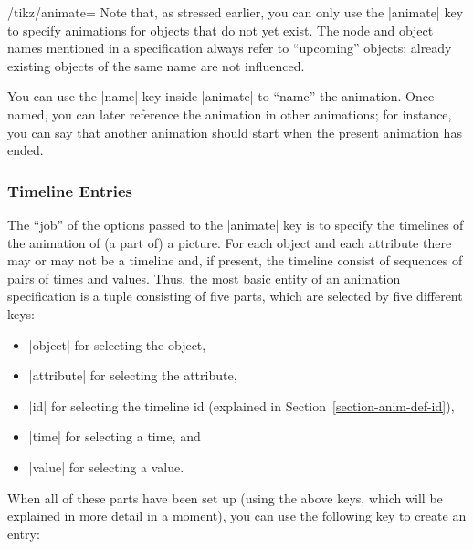 \begin{key}{/tikz/animate=}
    Note that, as stressed earlier, you can only use the |animate| key to
    specify animations for objects that do not yet exist. The node and object
    names mentioned in a specification always refer to ``upcoming'' objects;
    already existing objects of the same name are not influenced.

    You can use the |name| key inside |animate| to ``name'' the animation. Once
    named, you can later reference the animation in other animations; for
    instance, you can say that another animation should start when the present
    animation has ended.
\end{key}


\subsubsection{Timeline Entries}

The ``job'' of the options passed to the |animate| key is to specify the
timelines of the animation of (a part of) a picture. For each object and each
attribute there may or may not be a timeline and, if present, the timeline
consist of sequences of pairs of times and values. Thus, the most basic entity
of an animation specification is a tuple consisting of five parts, which are
selected by five different keys:
%
\begin{itemize}
    \item |object| for selecting the object,
    \item |attribute| for selecting the attribute,
    \item |id| for selecting the timeline id (explained in
        Section~\ref{section-anim-def-id}),
    \item |time| for selecting a time, and
    \item |value| for selecting a value.
\end{itemize}
%
When all of these parts have been set up (using the above keys, which will be
explained in more detail in a moment), you can use the following key to create
an entry:


